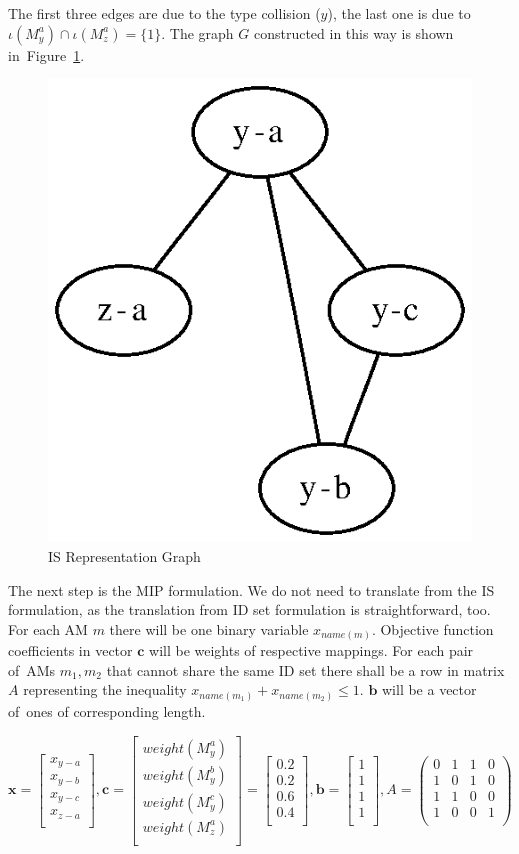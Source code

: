 The first three edges are due to the type collision ($y$), the last one is due to~$\iota(M_{y}^{a}) \cap \iota(M_{z}^{a}) = \{1\}$. The graph $G$ constructed in this way is shown in~Figure~\ref{image-mip-is-graph}.

\begin{figure}
  \caption{IS Representation Graph}
  \label{image-mip-is-graph}
  \centering
	 \includegraphics[width=.25\textwidth]{images/is-representation}
\end{figure}

The next step is the MIP formulation. We do not need to translate from the IS formulation, as the translation from ID set formulation is straightforward, too. For each AM $m$ there will be one binary variable $x_{name(m)}$. Objective function coefficients in vector $\mathbf{c}$ will be weights of respective mappings. For each pair of~AMs $m_1, m_2$ that cannot share the same ID set there shall be a row in matrix $A$ representing the inequality $x_{name(m_1)} + x_{name(m_2)} \leqslant 1$. $\mathbf{b}$ will be a vector of~ones of corresponding length.

\[
\mathbf{x} =
\begin{bmatrix}
x_{y-a} \\
x_{y-b} \\
x_{y-c} \\
x_{z-a} \\
\end{bmatrix},
\mathbf{c} = 
\begin{bmatrix}
weight(M_{y}^{a}) \\
weight(M_{y}^{b}) \\
weight(M_{y}^{c}) \\
weight(M_{z}^{a}) \\
\end{bmatrix} =
\begin{bmatrix}
0.2 \\
0.2 \\
0.6 \\
0.4 \\
\end{bmatrix},
\mathbf{b} =
\begin{bmatrix}
1 \\
1 \\
1 \\
1 \\
\end{bmatrix},
A =
\begin{pmatrix}
0 & 1 & 1 & 0 \\
1 & 0 & 1 & 0 \\
1 & 1 & 0 & 0 \\
1 & 0 & 0 & 1 \\
\end{pmatrix}
\]

